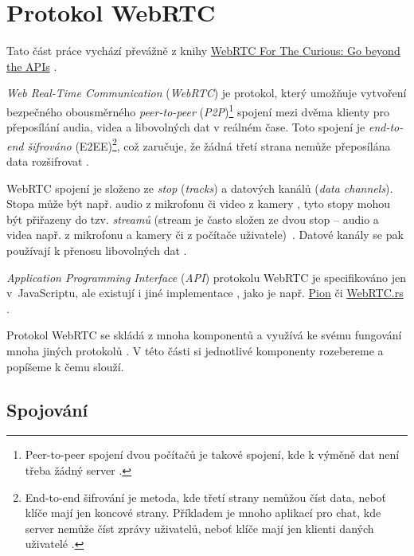 
\section{Protokol WebRTC}\label{webRTC}

Tato část práce vychází převážně z knihy
\href{https://webrtcforthecurious.com/}{WebRTC For The Curious: Go beyond the
	APIs} \cite{WebRTCForTheCurious}.

\textit{Web Real-Time Communication} (\textit{WebRTC}) je protokol, který
umožňuje vytvoření bezpečného obousměrného \textit{peer-to-peer}
(\textit{P2P})\footnote{Peer-to-peer spojení dvou počítačů je takové spojení,
kde k výměně dat není třeba žádný server \cite{MerriamWebster-PeerToPeer}.}
spojení mezi dvěma klienty pro přeposílání audia, videa a libovolných dat v
reálném čase. Toto spojení je \textit{end-to-end šifrováno}
(E2EE)\footnote{End-to-end šifrování je metoda, kde třetí strany nemůžou číst
data, neboť klíče mají jen koncové strany. Příkladem je mnoho aplikací pro chat,
kde server nemůže číst zprávy uživatelů, neboť klíče mají jen klienti daných
uživatelé \cite{IBM-EndToEndEncryption}.}, což zaručuje, že žádná třetí strana
nemůže přeposílána data rozšifrovat \cite{WebRTCForTheCurious}.

WebRTC spojení je složeno ze \textit{stop} (\textit{tracks}) a datových kanálů
(\textit{data channels}). Stopa může být např. audio z mikrofonu či video z
kamery \cite{MDN-WebRTC-MediaStreamTrack}, tyto stopy mohou být přiřazeny do
tzv. \textit{streamů} (stream je často složen ze dvou stop -- audio a videa
např. z mikrofonu a kamery či z počítače
uživatele)~\cite{MDN-WebRTC-MediaStream}. Datové kanály se pak používají k
přenosu libovolných dat \cite{WebRTCORG-GettingStarted-DataChannels}.

\textit{Application Programming Interface} (\textit{API}) protokolu WebRTC je
specifikováno jen v~JavaScriptu, ale existují i jiné implementace
\cite{WebRTCForTheCurious}, jako je např. \href{pion/webrtc: Pure Go
	implementation of the WebRTC API}{Pion} \cite{GitHub-Pion-WebRTC} či
\href{https://github.com/webrtc-rs/webrtc}{WebRTC.rs}
\cite{GitHub-WebRTCRS-WebRTC}.

Protokol WebRTC se skládá z mnoha komponentů a využívá ke svému fungování mnoha
jiných protokolů \cite{WebRTCForTheCurious}. V této části si jednotlivé
komponenty rozebereme a popíšeme k čemu slouží.

\subsection{Spojování}\label{connecting}

